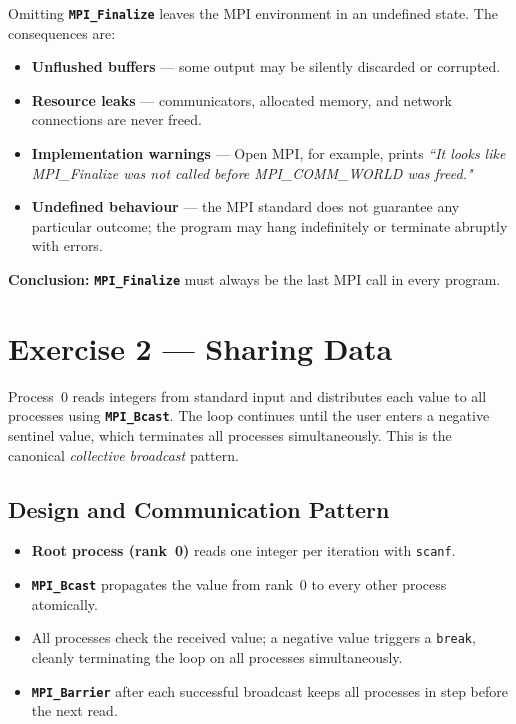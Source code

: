\documentclass[12pt,a4paper]{article}
\newcommand{\mpiname}[1]{\texttt{\textbf{#1}}}
\begin{document}
\begin{answerbox}
Omitting \mpiname{MPI\_Finalize} leaves the MPI environment in an
undefined state. The consequences are:
\begin{itemize}[nosep, leftmargin=1.2em]
  \item \textbf{Unflushed buffers} — some output may be silently discarded
        or corrupted.
  \item \textbf{Resource leaks} — communicators, allocated memory, and
        network connections are never freed.
  \item \textbf{Implementation warnings} — Open MPI, for example, prints
        \emph{``It looks like MPI\_Finalize was not called before
        MPI\_COMM\_WORLD was freed."}
  \item \textbf{Undefined behaviour} — the MPI standard does not guarantee
        any particular outcome; the program may hang indefinitely or
        terminate abruptly with errors.
\end{itemize}
\textbf{Conclusion:} \mpiname{MPI\_Finalize} must always be the last MPI
call in every program.
\end{answerbox}

\newpage
\section{Exercise 2 — Sharing Data}

Process~0 reads integers from standard input and distributes each value to
all processes using \mpiname{MPI\_Bcast}.
The loop continues until the user enters a negative sentinel value, which
terminates all processes simultaneously.
This is the canonical \textit{collective broadcast} pattern.

\subsection{Design and Communication Pattern}

\begin{itemize}[leftmargin=1.5em]
  \item \textbf{Root process (rank~0)} reads one integer per iteration with
        \texttt{scanf}.
  \item \mpiname{MPI\_Bcast} propagates the value from rank~0 to every
        other process atomically.
  \item All processes check the received value; a negative value triggers a
        \texttt{break}, cleanly terminating the loop on all processes
        simultaneously.
  \item \mpiname{MPI\_Barrier} after each successful broadcast keeps
        all processes in step before the next read.
\end{itemize}
\end{document}
